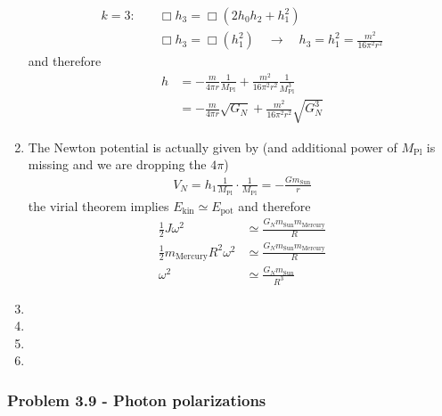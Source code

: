 \documentclass[10pt,a4paper]{book}
\theoremstyle{definition}
\begin{document}
\begin{enumerate}[label=(\alph*)]
\begin{align}
k=3:&\quad\Box h_3=\Box(2h_0h_2+h_1^2)\\
    &\quad\Box h_3=\Box(h_1^2)\quad\rightarrow\quad h_3=h_1^2=\frac{m^2}{16\pi^2r^2}
\end{align}
and therefore
\begin{align}
h&=-\frac{m}{4\pi r}\frac{1}{M_\text{Pl}}+\frac{m^2}{16\pi^2r^2}\frac{1}{M_\text{Pl}^3}\\
&=-\frac{m}{4\pi r}\sqrt{G_N}+\frac{m^2}{16\pi^2r^2}\sqrt{G_N^3}
\end{align}
\item 
The Newton potential is actually given by (and additional power of $M_\text{Pl}$ is missing and we are dropping the $4\pi$)
\begin{align}
V_N=h_1\frac{1}{M_\text{Pl}}\cdot\frac{1}{M_\text{Pl}}=-\frac{Gm_\text{Sun}}{r}
\end{align}
the virial theorem implies $E_\text{kin}\simeq E_\text{pot}$ and therefore
\begin{align}
\frac{1}{2}J\omega^2&\simeq \frac{G_N m_\text{Sun} m_\text{Mercury}}{R}\\
\frac{1}{2}m_\text{Mercury}R^2\omega^2&\simeq \frac{G_N m_\text{Sun} m_\text{Mercury}}{R}\\
\omega^2&\simeq\frac{G_Nm_\text{Sun}}{R^3}
\end{align}

\item 
\item 
\item 
\item 
\end{enumerate}

\subsubsection{Problem 3.9 - Photon polarizations}
\end{document}
